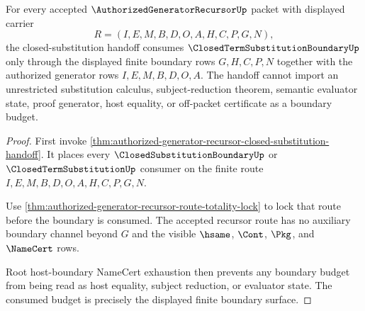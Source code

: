 \begin{theorem}
\label{thm:authorized-generator-recursor-closed-substitution-budget-lock}
For every accepted $\AuthorizedGeneratorRecursorUp$ packet with displayed carrier
$$
R=(I,E,M,B,D,O,A,H,C,P,G,N),
$$
the closed-substitution handoff consumes $\ClosedTermSubstitutionBoundaryUp$ only through the displayed finite boundary rows $G,H,C,P,N$ together with the authorized generator rows $I,E,M,B,D,O,A$. The handoff cannot import an unrestricted substitution calculus, subject-reduction theorem, semantic evaluator state, proof generator, host equality, or off-packet certificate as a boundary budget.
\end{theorem}
\begin{proof}
First invoke \autoref{thm:authorized-generator-recursor-closed-substitution-handoff}. It places every $\ClosedSubstitutionBoundaryUp$ or $\ClosedTermSubstitutionUp$ consumer on the finite route $I,E,M,B,D,O,A,H,C,P,G,N$.

Use \autoref{thm:authorized-generator-recursor-route-totality-lock} to lock that route before the boundary is consumed. The accepted recursor route has no auxiliary boundary channel beyond $G$ and the visible $\hsame$, $\Cont$, $\Pkg$, and $\NameCert$ rows.

Root host-boundary NameCert exhaustion then prevents any boundary budget from being read as host equality, subject reduction, or evaluator state. The consumed budget is precisely the displayed finite boundary surface.
\end{proof}

